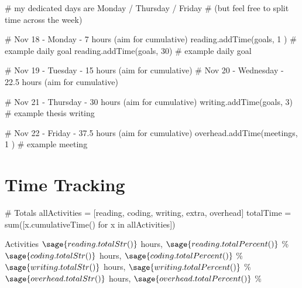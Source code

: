 \documentclass[weekly_log.tex]{subfiles}
\begin{document}
\begin{verbatim}
\end{verbatim}


\begin{sagesilent}
    # my dedicated days are Monday / Thursday / Friday
    # (but feel free to split time across the week)

    # Nov 18  - Monday    - 7   hours  (aim for cumulative)
    reading.addTime(goals, 1 )      # example daily goal
    reading.addTime(goals, 30)      # example daily goal

    # Nov 19  - Tuesday   - 15 hours   (aim for cumulative)
    # Nov 20  - Wednesday - 22.5 hours (aim for cumulative)

    # Nov 21  - Thursday  - 30 hours   (aim for cumulative)
    writing.addTime(goals, 3)       # example thesis writing

    # Nov 22  - Friday    - 37.5 hours (aim for cumulative)
    overhead.addTime(meetings, 1 )  # example meeting

\end{sagesilent}




\clearpage
\section{Time Tracking}
\begin{sagesilent}
    
    # Totals
    allActivities = [reading, coding, writing, extra, overhead]
    totalTime = sum([x.cumulativeTime() for x in allActivities])
\end{sagesilent}




\begin{timebox}{Activities}
              {$\sage{reading.totalStr()}$ hours,
                               $\sage{reading.totalPercent()}$ \%}
              {$\sage{coding.totalStr()}$ hours,
                               $\sage{coding.totalPercent()}$ \%}
              {$\sage{writing.totalStr()}$ hours,
                                 $\sage{writing.totalPercent()}$ \%}
              {$\sage{overhead.totalStr()}$ hours,
                               $\sage{overhead.totalPercent()}$ \%}
  \end{timebox}
  
\end{document}
